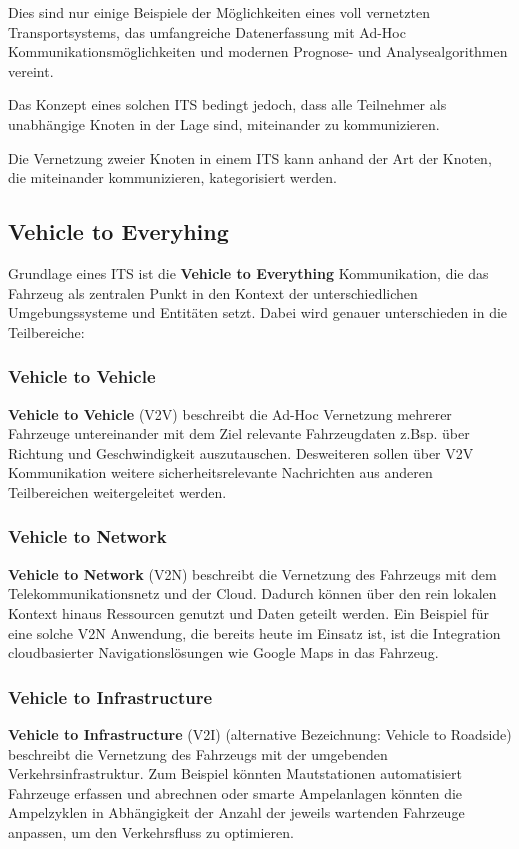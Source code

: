     Dies sind nur einige Beispiele der Möglichkeiten eines voll vernetzten Transportsystems, das umfangreiche Datenerfassung mit Ad-Hoc Kommunikationsmöglichkeiten und
    modernen Prognose- und Analysealgorithmen vereint.

    Das Konzept eines solchen ITS bedingt jedoch, dass alle Teilnehmer als unabhängige Knoten in der Lage sind, miteinander zu kommunizieren.

    Die Vernetzung zweier Knoten in einem ITS kann anhand der Art der Knoten, die miteinander kommunizieren, kategorisiert werden.
    \newpage
    \subsection{Vehicle to Everyhing}
    Grundlage eines ITS ist die \textbf{Vehicle to Everything} Kommunikation, die das Fahrzeug als zentralen Punkt in den
    Kontext der unterschiedlichen Umgebungssysteme und Entitäten setzt. Dabei wird genauer unterschieden in die Teilbereiche:
    
    \subsubsection{Vehicle to Vehicle}
    \textbf{Vehicle to Vehicle} (V2V) beschreibt die Ad-Hoc Vernetzung mehrerer Fahrzeuge untereinander mit dem Ziel relevante Fahrzeugdaten z.Bsp. über Richtung und Geschwindigkeit auszutauschen.
    Desweiteren sollen über V2V Kommunikation weitere sicherheitsrelevante Nachrichten aus anderen Teilbereichen weitergeleitet werden.

    \subsubsection{Vehicle to Network}
    \textbf{Vehicle to Network} (V2N) beschreibt die Vernetzung des Fahrzeugs mit dem Telekommunikationsnetz und der Cloud. Dadurch können über den
    rein lokalen Kontext hinaus Ressourcen genutzt und Daten geteilt werden. Ein Beispiel für eine solche V2N Anwendung, die bereits heute
    im Einsatz ist, ist die Integration cloudbasierter Navigationslösungen wie Google Maps in das Fahrzeug.
    
    \subsubsection{Vehicle to Infrastructure}
    \textbf{Vehicle to Infrastructure} (V2I) (alternative Bezeichnung: Vehicle to Roadside) beschreibt die Vernetzung des Fahrzeugs mit der umgebenden Verkehrsinfrastruktur. 
    Zum Beispiel könnten Mautstationen automatisiert Fahrzeuge erfassen und abrechnen oder smarte Ampelanlagen könnten die Ampelzyklen in Abhängigkeit
    der Anzahl der jeweils wartenden Fahrzeuge anpassen, um den Verkehrsfluss zu optimieren. 

